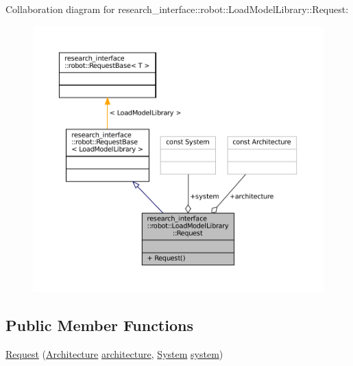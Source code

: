 Collaboration diagram for research\+\_\+interface\+:\+:robot\+:\+:Load\+Model\+Library\+:\+:Request\+:
\nopagebreak
\begin{figure}[H]
\begin{center}
\leavevmode
\includegraphics[width=350pt]{structresearch__interface_1_1robot_1_1LoadModelLibrary_1_1Request__coll__graph}
\end{center}
\end{figure}
\subsection*{Public Member Functions}
\begin{DoxyCompactItemize}
\item 
\hyperlink{structresearch__interface_1_1robot_1_1LoadModelLibrary_1_1Request_a56df74b54d4b80b4f02562df80aa5e24}{Request} (\hyperlink{structresearch__interface_1_1robot_1_1LoadModelLibrary_a89a2ad9a252c52861614214df33511f8}{Architecture} \hyperlink{structresearch__interface_1_1robot_1_1LoadModelLibrary_1_1Request_a4b22348dd3f368d9c2597e1f07cdccb5}{architecture}, \hyperlink{structresearch__interface_1_1robot_1_1LoadModelLibrary_a64b0f0f01e8f2716ef4c2478037559eb}{System} \hyperlink{structresearch__interface_1_1robot_1_1LoadModelLibrary_1_1Request_a7d34eb1951a91b5a512cae693e1f77a9}{system})
\end{DoxyCompactItemize}
